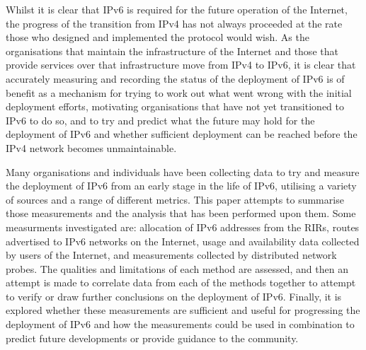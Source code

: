 Whilst it is clear that IPv6 is required for the future operation of the
Internet\cite{huston_ipv6_2008}, the progress of the transition from IPv4  has not always proceeded
at the rate those who designed and implemented the protocol would wish. As the
organisations that maintain the infrastructure of the Internet and those that
provide services over that infrastructure move from IPv4 to IPv6, it is clear
that accurately measuring and recording the status of the deployment of IPv6
is of benefit as a mechanism for trying to work out what went wrong with
the initial deployment efforts, motivating organisations that have not yet
transitioned to IPv6 to do so, and to try and predict what the future may hold
for the deployment of IPv6 and whether sufficient deployment can be reached before
the IPv4 network becomes unmaintainable\cite{huston_primer_2013}.

Many organisations and individuals have been collecting data to try and measure
the deployment of IPv6 from an
early stage in the life of IPv6, utilising a variety of sources and a range of
different metrics. This paper attempts to summarise those measurements and
the analysis that has been performed upon them. Some measurments investigated
are: allocation of IPv6 addresses from the RIRs, routes advertised to IPv6
networks on the Internet,  
usage and availability data collected by users of the Internet, and measurements
collected by distributed network probes.
The qualities and limitations of each method are assessed, and then an attempt
is made to correlate data from each of the methods together to attempt to verify
or draw further conclusions on the deployment of IPv6. 
Finally, it is explored whether these
measurements are sufficient and useful for progressing
the deployment of IPv6 and how the measurements could be used in combination to
predict future developments or provide guidance to the community.

